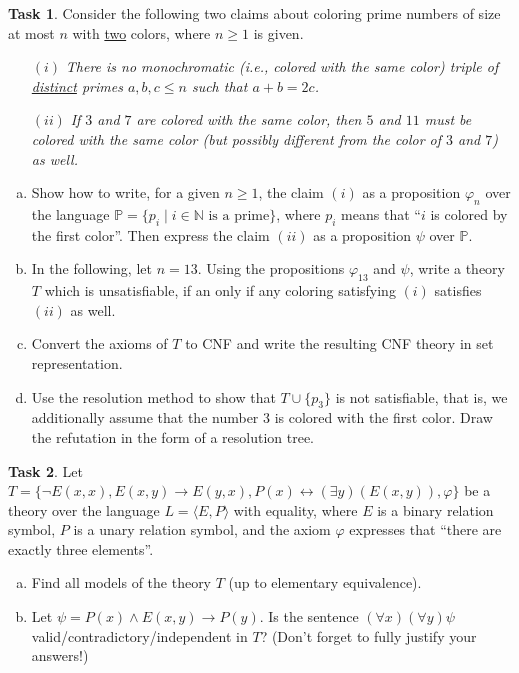 \documentclass[a4paper]{amsart}
\theoremstyle{definition}
\newtheorem{task}{Task}
\begin{document}
\bigskip

\begin{task}
Consider the following two claims about coloring prime numbers of size at most $n$ with \underline{two} colors, where $n\ge 1$ is given.
\begin{enumerate}
\item[$(i)$] {\it There is no monochromatic (i.e., colored with the same color) triple of \underline{distinct} primes $a,b,c \le n$ such that $a+b=2c$.}
\item[$(ii)$] {\it If $3$ and $7$ are colored with the same color, then $5$ and $11$ must be colored with the same color (but possibly different from the color of $3$ and $7$) as well.}
\end{enumerate}

\bigskip


\begin{enumerate}[(a)]
\item Show how to write, for a given $n\ge 1$, the claim $(i)$ as a proposition $\varphi_n$ over the language $\mathbb{P}=\{p_i \mid i\in \mathbb{N}\text{ is a prime}\}$, where $p_i$ means that ``$i$ is colored by the first color''. Then express the claim $(ii)$ as a proposition $\psi$ over $\mathbb{P}$. 
\item In the following, let $n=13$. Using the propositions $\varphi_{13}$ and $\psi$, write a theory $T$ which is unsatisfiable, if an only if any coloring satisfying $(i)$ satisfies $(ii)$ as well.
\item Convert the axioms of $T$ to CNF and write the resulting CNF theory in set representation. 
\item Use the resolution method to show that $T \cup \{p_3\}$ is not satisfiable, that is, we additionally assume that the number 3 is colored with the first color. Draw the refutation in the form of a resolution tree.
\end{enumerate}
\end{task}

\bigskip
\begin{task}
Let $T = \{\neg E(x, x), E(x, y) \to E(y, x), P(x) \leftrightarrow (\exists y)( E(x,y)),\varphi\}$ be a theory over the language $L =\langle E, P\rangle$ with equality, where $E$ is a binary relation symbol, $P$ is a unary relation symbol, and the axiom $\varphi$ expresses that ``there are exactly three elements''.
\begin{enumerate}[(a)]
\item Find all models of the theory $T$ (up to elementary equivalence). 
\item Let $\psi=P(x)\wedge E(x,y)\to P(y)$. Is the sentence $(\forall x)(\forall y)\psi$ valid/contradictory/independent in $T$? (Don't forget to fully justify your answers!)
\end{enumerate}
\end{task}
\end{document}
